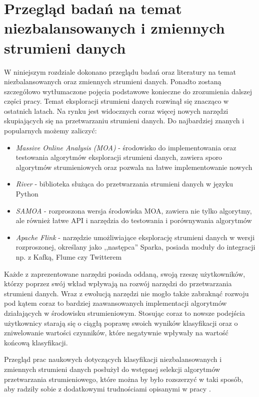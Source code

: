 \chapter{Przegląd badań na temat niezbalansowanych i zmiennych strumieni danych}

\noindent W niniejszym rozdziale dokonano przeglądu badań oraz literatury na temat niezbalansowanych oraz zmiennych strumieni danych. Ponadto zostaną szczegółowo wytłumaczone pojęcia podstawowe konieczne do zrozumienia dalszej części pracy. Temat eksploracji strumieni danych rozwinął się znacząco w ostatnich latach. Na rynku jest widocznych coraz więcej nowych narzędzi skupiających się na przetwarzaniu strumieni danych. Do najbardziej znanych i popularnych możemy zaliczyć:

\begin{itemize}
    \item \textit{Massive Online Analysis (MOA)} - środowisko do implementowania oraz testowania algorytmów eksploracji strumieni danych, zawiera sporo algorytmów strumieniowych oraz pozwala na łatwe implementowanie nowych \cite{Article:MOA}
    \item \textit{River} - biblioteka służąca do przetwarzania strumieni danych w języku Python \cite{Article:River}
    \item \textit{SAMOA} - rozproszona wersja środowiska MOA, zawiera nie tylko algorytmy, ale również łatwe API i narzędzia do testowania i porównywania algorytmów \cite{Article:Samoa}
    \item \textit{Apache Flink} - narzędzie umożliwiające eksplorację strumieni danych w wersji rozproszonej, określany jako ,,następca'' Sparka, posiada moduły do integracji np. z Kafką, Flume czy Twitterem \cite{Article:Flink}
\end{itemize}

\noindent Każde z zaprezentowane narzędzi posiada oddaną, swoją rzeszę użytkowników, którzy poprzez swój wkład wpływają na rozwój narzędzi do przetwarzania strumieni danych. Wraz z ewolucją narzędzi nie mogło także zabraknąć rozwoju pod kątem coraz to bardziej zaawansowanych implementacji algorytmów działających w środowisku strumieniowym. Stosując coraz to nowsze podejścia użytkownicy starają się o ciągłą poprawę swoich wyników klasyfikacji oraz o zniwelowanie wartości czynników, które negatywnie wpływały na wartość końcową klasyfikacji. 

Przegląd prac naukowych dotyczących klasyfikacji niezbalansowanych i zmiennych strumieni danych posłużył do wstępnej selekcji algorytmów przetwarzania strumieniowego, które można by było rozszerzyć w taki sposób, aby radziły sobie z dodatkowymi trudnościami opisanymi w pracy \cite{Article:TypyPrzykladow}.

